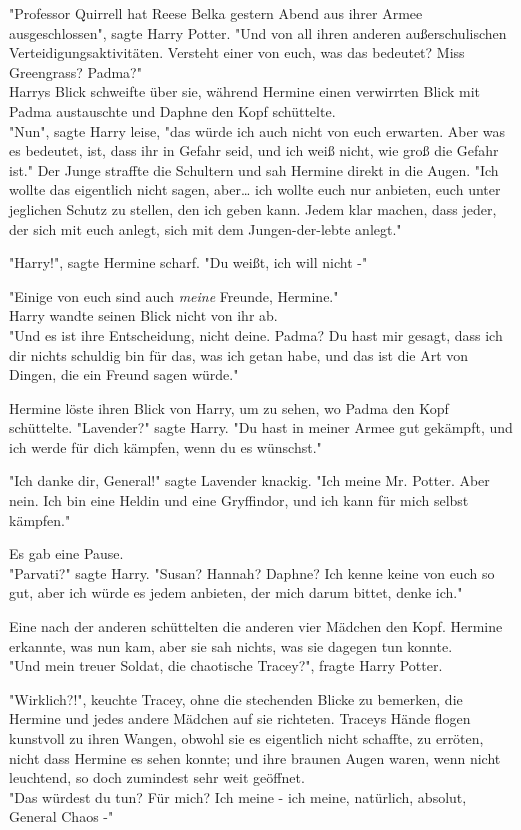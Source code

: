 {"Professor Quirrell hat Reese Belka gestern Abend aus ihrer Armee ausgeschlossen", sagte Harry Potter. "Und von all ihren anderen außerschulischen Verteidigungsaktivitäten. Versteht einer von euch, was das bedeutet? Miss Greengrass? Padma?"\\ Harrys Blick schweifte über sie, während Hermine einen verwirrten Blick mit Padma austauschte und Daphne den Kopf schüttelte.\\ "Nun", sagte Harry leise, "das würde ich auch nicht von euch erwarten. Aber was es bedeutet, ist, dass ihr in Gefahr seid, und ich weiß nicht, wie groß die Gefahr ist." Der Junge straffte die Schultern und sah Hermine direkt in die Augen. "Ich wollte das eigentlich nicht sagen, aber… ich wollte euch nur anbieten, euch unter jeglichen Schutz zu stellen, den ich geben kann. Jedem klar machen, dass jeder, der sich mit euch anlegt, sich mit dem Jungen-der-lebte anlegt."

"Harry!", sagte Hermine scharf. "Du weißt, ich will nicht -"

"Einige von euch sind auch \emph{meine} Freunde, Hermine."\\ Harry wandte seinen Blick nicht von ihr ab.\\ "Und es ist ihre Entscheidung, nicht deine. Padma? Du hast mir gesagt, dass ich dir nichts schuldig bin für das, was ich getan habe, und das ist die Art von Dingen, die ein Freund sagen würde."

Hermine löste ihren Blick von Harry, um zu sehen, wo Padma den Kopf schüttelte. "Lavender?" sagte Harry. "Du hast in meiner Armee gut gekämpft, und ich werde für dich kämpfen, wenn du es wünschst."

"Ich danke dir, General!" sagte Lavender knackig. "Ich meine Mr. Potter. Aber nein. Ich bin eine Heldin und eine Gryffindor, und ich kann für mich selbst kämpfen."

Es gab eine Pause.\\ "Parvati?" sagte Harry. "Susan? Hannah? Daphne? Ich kenne keine von euch so gut, aber ich würde es jedem anbieten, der mich darum bittet, denke ich."

Eine nach der anderen schüttelten die anderen vier Mädchen den Kopf. Hermine erkannte, was nun kam, aber sie sah nichts, was sie dagegen tun konnte.\\ "Und mein treuer Soldat, die chaotische Tracey?", fragte Harry Potter.

"Wirklich?!", keuchte Tracey, ohne die stechenden Blicke zu bemerken, die Hermine und jedes andere Mädchen auf sie richteten. Traceys Hände flogen kunstvoll zu ihren Wangen, obwohl sie es eigentlich nicht schaffte, zu erröten, nicht dass Hermine es sehen konnte; und ihre braunen Augen waren, wenn nicht leuchtend, so doch zumindest sehr weit geöffnet.\\ "Das würdest du tun? Für mich? Ich meine - ich meine, natürlich, absolut, General Chaos -"

}

